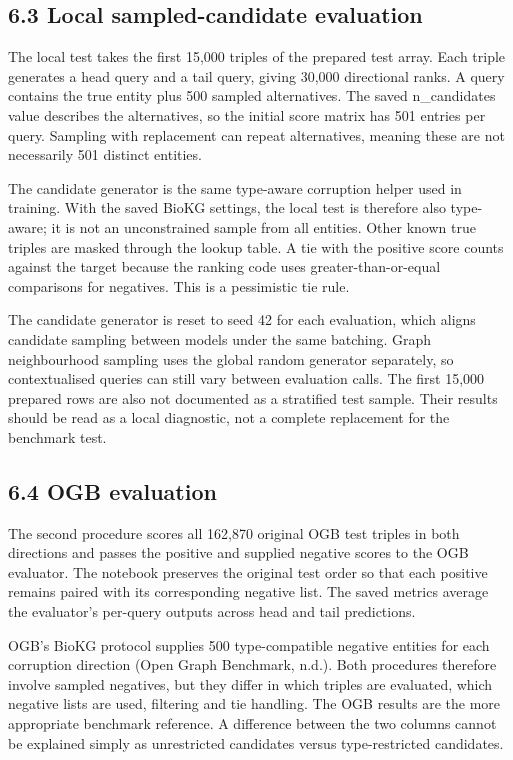 \documentclass[11pt]{article}
\begin{document}
\subsection*{6.3 Local sampled-candidate evaluation}
The local test takes the first 15,000 triples of the prepared test array. Each triple generates a head query and a tail query, giving 30,000 directional ranks. A query contains the true entity plus 500 sampled alternatives. The saved n\_candidates value describes the alternatives, so the initial score matrix has 501 entries per query. Sampling with replacement can repeat alternatives, meaning these are not necessarily 501 distinct entities.

The candidate generator is the same type-aware corruption helper used in training. With the saved BioKG settings, the local test is therefore also type-aware; it is not an unconstrained sample from all entities. Other known true triples are masked through the lookup table. A tie with the positive score counts against the target because the ranking code uses greater-than-or-equal comparisons for negatives. This is a pessimistic tie rule.

The candidate generator is reset to seed 42 for each evaluation, which aligns candidate sampling between models under the same batching. Graph neighbourhood sampling uses the global random generator separately, so contextualised queries can still vary between evaluation calls. The first 15,000 prepared rows are also not documented as a stratified test sample. Their results should be read as a local diagnostic, not a complete replacement for the benchmark test.

\subsection*{6.4 OGB evaluation}
The second procedure scores all 162,870 original OGB test triples in both directions and passes the positive and supplied negative scores to the OGB evaluator. The notebook preserves the original test order so that each positive remains paired with its corresponding negative list. The saved metrics average the evaluator's per-query outputs across head and tail predictions.

OGB's BioKG protocol supplies 500 type-compatible negative entities for each corruption direction (Open Graph Benchmark, n.d.). Both procedures therefore involve sampled negatives, but they differ in which triples are evaluated, which negative lists are used, filtering and tie handling. The OGB results are the more appropriate benchmark reference. A difference between the two columns cannot be explained simply as unrestricted candidates versus type-restricted candidates.
\end{document}
